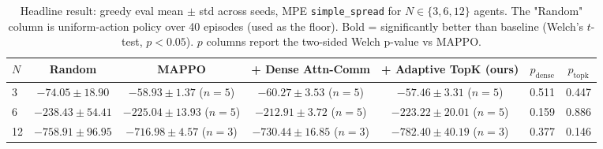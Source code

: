\begin{table}[t]
\centering
\footnotesize
\setlength{\tabcolsep}{4pt}
\begin{tabular}{lccccc c}
\toprule
$N$ & Random & MAPPO & + Dense Attn-Comm & + Adaptive TopK (ours) &
$p_{\text{dense}}$ & $p_{\text{topk}}$\\
\midrule
3 & $-74.05 \pm 18.90$ & $-58.93 \pm 1.37$ ($n{=}5$) & $-60.27 \pm 3.53$ ($n{=}5$) & $-57.46 \pm 3.31$ ($n{=}5$) & 0.511 & 0.447 \\
6 & $-238.43 \pm 54.41$ & $-225.04 \pm 13.93$ ($n{=}5$) & $-212.91 \pm 3.72$ ($n{=}5$) & $-223.22 \pm 20.01$ ($n{=}5$) & 0.159 & 0.886 \\
12 & $-758.91 \pm 96.95$ & $-716.98 \pm 4.57$ ($n{=}3$) & $-730.44 \pm 16.85$ ($n{=}3$) & $-782.40 \pm 40.19$ ($n{=}3$) & 0.377 & 0.146 \\
\bottomrule
\end{tabular}
\caption{Headline result: greedy eval mean $\pm$ std across seeds, MPE
\texttt{simple\_spread} for $N \in \{3, 6, 12\}$ agents. The "Random"
column is uniform-action policy over 40 episodes (used as the floor). Bold
= significantly better than baseline (Welch's $t$-test, $p<0.05$). $p$
columns report the two-sided Welch p-value vs MAPPO.}
\label{tab:headline}
\end{table}